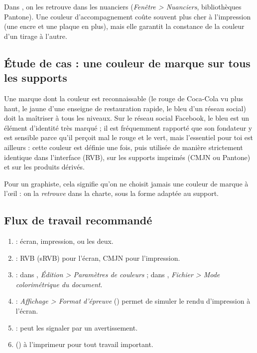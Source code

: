 Dans , on les retrouve dans les nuanciers (\emph{Fenêtre > Nuanciers}, bibliothèques Pantone). Une couleur d'accompagnement coûte souvent plus cher à l'impression (une encre et une plaque en plus), mais elle garantit la constance de la couleur d'un tirage à l'autre.

\subsection{Étude de cas : une couleur de marque sur tous les supports}

Une marque dont la couleur est reconnaissable (le rouge de Coca-Cola vu plus haut, le jaune d'une enseigne de restauration rapide, le bleu d'un réseau social) doit la maîtriser à tous les niveaux. Sur le réseau social Facebook, le bleu est un élément d'identité très marqué ; il est fréquemment rapporté que son fondateur y est sensible parce qu'il perçoit mal le rouge et le vert, mais l'essentiel pour toi est ailleurs : cette couleur est définie une fois, puis utilisée de manière strictement identique dans l'interface (RVB), sur les supports imprimés (CMJN ou Pantone) et sur les produits dérivés.

Pour un graphiste, cela signifie qu'on ne \og{}choisit\fg{} jamais une couleur de marque à l'œil : on la \emph{retrouve} dans la charte, sous la forme adaptée au support.

\subsection{Flux de travail recommandé}

\begin{enumerate}
  \item {} : écran, impression, ou les deux.
  \item {} : RVB (sRVB) pour l'écran, CMJN pour l'impression.
  \item {} : dans , \emph{Édition > Paramètres de couleurs} ; dans , \emph{Fichier > Mode colorimétrique du document}.
  \item {} : \emph{Affichage > Format d'épreuve} () permet de simuler le rendu d'impression à l'écran.
  \item {} :  peut les signaler par un avertissement.
  \item {} () à l'imprimeur pour tout travail important.
\end{enumerate}

